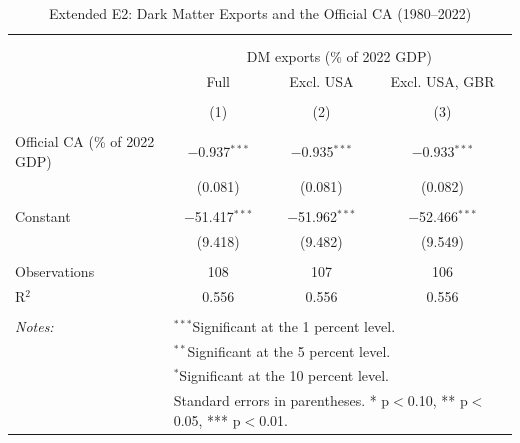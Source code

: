 \documentclass[11pt]{article}
\begin{document}
\small
\setcounter{table}{2}

\renewcommand{\thetable}{E2}
\begin{table}[!htbp] \centering 
  \caption{Extended E2: Dark Matter Exports and the Official CA (1980--2022)} 
  \label{tab:E2_ext} 
\begin{tabular}{@{\extracolsep{5pt}}lccc} 
\\[-1.8ex]\hline 
\hline \\[-1.8ex] 
\\[-1.8ex] & \multicolumn{3}{c}{DM exports (\% of 2022 GDP)} \\ 
 & Full & Excl. USA & Excl. USA, GBR \\ 
\\[-1.8ex] & (1) & (2) & (3)\\ 
\hline \\[-1.8ex] 
 Official CA (\% of 2022 GDP) & $-$0.937$^{***}$ & $-$0.935$^{***}$ & $-$0.933$^{***}$ \\ 
  & (0.081) & (0.081) & (0.082) \\ 
  & & & \\ 
 Constant & $-$51.417$^{***}$ & $-$51.962$^{***}$ & $-$52.466$^{***}$ \\ 
  & (9.418) & (9.482) & (9.549) \\ 
  & & & \\ 
Observations & 108 & 107 & 106 \\ 
R$^{2}$ & 0.556 & 0.556 & 0.556 \\ 
\hline \\[-1.8ex] 
\textit{Notes:} & \multicolumn{3}{l}{$^{***}$Significant at the 1 percent level.} \\ 
 & \multicolumn{3}{l}{$^{**}$Significant at the 5 percent level.} \\ 
 & \multicolumn{3}{l}{$^{*}$Significant at the 10 percent level.} \\ 
 & \multicolumn{3}{l}{Standard errors in parentheses. * p$<$0.10, ** p$<$0.05, *** p$<$0.01.} \\ 
\end{tabular} 
\end{table} 
\end{document}
